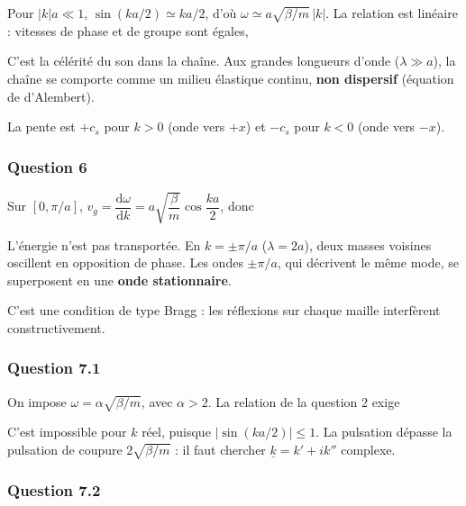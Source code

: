 \documentclass[11pt,a4paper]{article}
\renewcommand{\leq}{\leqslant}
\newcommand{\equationajustee}[1]{%
  \sbox{\boiteequation}{$\displaystyle #1$}%
  \ifdim\wd\boiteequation>\linewidth
    \[\resizebox{\linewidth}{!}{\usebox{\boiteequation}}\]%
  \else
    \[#1\]%
  \fi}
\begin{document}
Pour \(\lvert k\rvert a\ll1\), \(\sin(ka/2)\simeq ka/2\), d'où \(\omega\simeq a\sqrt{\beta/m}\,\lvert k\rvert\). La relation est linéaire : vitesses de phase et de groupe sont égales,

\equationajustee{\boxed{c_s=a\sqrt{\frac{\beta}{m}}}}

C'est la célérité du son dans la chaîne. Aux grandes longueurs d'onde (\(\lambda\gg a\)), la chaîne se comporte comme un milieu élastique continu, \textbf{non dispersif} (équation de d'Alembert).

La pente est \(+c_s\) pour \(k>0\) (onde vers \(+x\)) et \(-c_s\) pour \(k<0\) (onde vers \(-x\)).

\hypertarget{question-6}{%
\subsubsection{Question 6}\label{question-6}}

Sur \([0,\pi/a]\), \(v_g=\dfrac{\mathrm d\omega}{\mathrm dk}=a\sqrt{\dfrac{\beta}{m}}\cos\dfrac{ka}{2}\), donc

\equationajustee{\boxed{v_g\left(\pm\frac{\pi}{a}\right)=0}}

L'énergie n'est pas transportée. En \(k=\pm\pi/a\) (\(\lambda=2a\)), deux masses voisines oscillent en opposition de phase. Les ondes \(\pm\pi/a\), qui décrivent le même mode, se superposent en une \textbf{onde stationnaire}.

C'est une condition de type Bragg : les réflexions sur chaque maille interfèrent constructivement.

\hypertarget{question-7.1}{%
\subsubsection{Question 7.1}\label{question-7.1}}

On impose \(\omega=\alpha\sqrt{\beta/m}\), avec \(\alpha>2\). La relation de la question 2 exige

\equationajustee{\sin^2\frac{ka}{2}=\frac{m\omega^2}{4\beta}=\frac{\alpha^2}{4}>1}

C'est impossible pour \(k\) réel, puisque \(\lvert\sin(ka/2)\rvert\leq1\). La pulsation dépasse la pulsation de coupure \(2\sqrt{\beta/m}\) : il faut chercher \(\underline k=k'+ik''\) complexe.

\hypertarget{question-7.2}{%
\subsubsection{Question 7.2}\label{question-7.2}}
\end{document}
